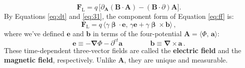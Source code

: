 \documentclass[12pt]{article}
\renewcommand{\vv}[1]{\mathbf{#1}}
\newcommand{\vvbeta}{\bm{\upbeta}}
\newcommand{\del}{\boldsymbol{\nabla}}
\begin{document}
\begin{equation}\label{eq:lff}
\vv F_{\textrm{L}} = q \, \bigl[ \partialup_{\vv A} (\vv B \cdot \vv A) - (\vv B \cdot \partialup) \vv A \bigr] .\end{equation}
By Equations \ref{eq:dt} and \ref{eq:31}, the component form of Equation \ref{eq:ff} is:
\begin{equation}\label{eq:lfc}
\boxed{ \vv F_{\textrm{L}} = q \, \big \langle \gamma \vvbeta \cdot \vv e , \, \gamma \vv e + \gamma \vvbeta \times \vv b \big \rangle } \, ,
\end{equation}
where we've defined $\vv e$ and $\vv b$ in terms of the four-potential $\vv A = \langle \Phi, \, \vv a \rangle$:
\begin{equation}\label{eq:eb}
\boxed{ \vv e \equiv - \del \Phi - \partial^{ct} \vv a \qquad \qquad \vv b \equiv \del \times \vv a } \, .
\end{equation}
These time-dependent three-vector fields are called the \textbf{electric field} and the \textbf{magnetic field}, respectively. Unlike $\vv A$, they are unique and measurable.
\end{document}
